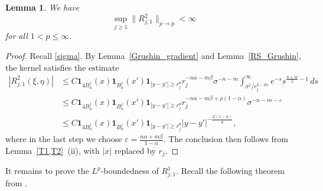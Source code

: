 \documentclass[12pt]{amsart}
\newtheorem{lemma}[theorem]{Lemma}
\begin{document}
\begin{lemma}\label{Rj,1,2}
We have
    \begin{equation*}
        \sup_{j\ge 1} \|R_{j,1}^2\|_{p\to p} <\infty
    \end{equation*}
    for all $1<p\le \infty$.
\end{lemma}

\begin{proof}
Recall \eqref{sigma}. By Lemma~\ref{Grushin_gradient} and Lemma~\ref{RS_Grushin}, the kernel satisfies the estimate
\begin{align*}
    |R_{j,1}^2(\xi,\eta)|
    &\le C \mathbf{1}_{4B_n^j}(x) \mathbf{1}_{B_n^j}(x') \mathbf{1}_{|y-y'|\ge r_{j}^{\mathfrak a}} r_j^{-n\alpha-m\beta} \sigma^{-n-m} \int_{\sigma^2/r_j^{2-2\alpha}}^\infty e^{-s} s^{\frac{n+m}{2}-1} \, ds\\
    &\le C \mathbf{1}_{4B_n^j}(x) \mathbf{1}_{B_n^j}(x') \mathbf{1}_{|y-y'|\ge r_{j}^{\mathfrak a}} r_j^{-n\alpha-m\beta+\rho(1-\alpha)} \sigma^{-n-m-\varepsilon}\\
    &\le C \mathbf{1}_{4B_n^j}(x) \mathbf{1}_{B_n^j}(x') \mathbf{1}_{|y-y'|\ge r_{j}^{\mathfrak a}} |y-y'|^{-\frac{\mathcal{Q}(1-\alpha)}{\mathfrak a}},
\end{align*}
where in the last step we choose $\varepsilon = \frac{n\alpha+m\beta}{1-\alpha}$. The conclusion then follows from Lemma~\ref{T1,T2}~(ii), with $|x|$ replaced by $r_j$.
\end{proof}

It remains to prove the $L^p$-boundedness of $R_{j,1}^1$. Recall the following theorem from \cite{ACDH}.
\end{document}
